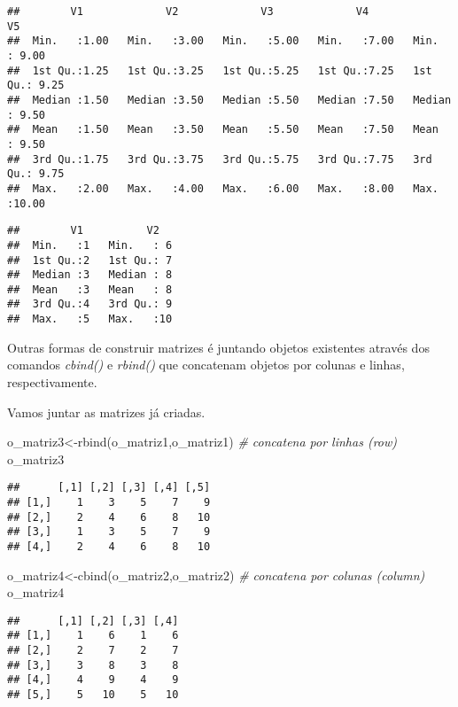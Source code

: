 \documentclass[
]{book}
\newenvironment{Shaded}{\begin{snugshade}}{\end{snugshade}}
\newcommand{\CommentTok}[1]{\textcolor[rgb]{0.56,0.35,0.01}{\textit{#1}}}
\newcommand{\FunctionTok}[1]{\textcolor[rgb]{0.00,0.00,0.00}{#1}}
\newcommand{\NormalTok}[1]{#1}
\newcommand{\OtherTok}[1]{\textcolor[rgb]{0.56,0.35,0.01}{#1}}
\begin{document}
\begin{verbatim}
##        V1             V2             V3             V4             V5       
##  Min.   :1.00   Min.   :3.00   Min.   :5.00   Min.   :7.00   Min.   : 9.00  
##  1st Qu.:1.25   1st Qu.:3.25   1st Qu.:5.25   1st Qu.:7.25   1st Qu.: 9.25  
##  Median :1.50   Median :3.50   Median :5.50   Median :7.50   Median : 9.50  
##  Mean   :1.50   Mean   :3.50   Mean   :5.50   Mean   :7.50   Mean   : 9.50  
##  3rd Qu.:1.75   3rd Qu.:3.75   3rd Qu.:5.75   3rd Qu.:7.75   3rd Qu.: 9.75  
##  Max.   :2.00   Max.   :4.00   Max.   :6.00   Max.   :8.00   Max.   :10.00
\end{verbatim}

\begin{verbatim}
##        V1          V2    
##  Min.   :1   Min.   : 6  
##  1st Qu.:2   1st Qu.: 7  
##  Median :3   Median : 8  
##  Mean   :3   Mean   : 8  
##  3rd Qu.:4   3rd Qu.: 9  
##  Max.   :5   Max.   :10
\end{verbatim}

Outras formas de construir matrizes é juntando objetos existentes através dos comandos \emph{cbind()} e \emph{rbind()} que concatenam objetos por colunas e linhas, respectivamente.

Vamos juntar as matrizes já criadas.

\begin{Shaded}
\begin{Highlighting}[]
\NormalTok{o\_matriz3}\OtherTok{\textless{}{-}}\FunctionTok{rbind}\NormalTok{(o\_matriz1,o\_matriz1) }\CommentTok{\# concatena por linhas (row)}
\NormalTok{o\_matriz3}
\end{Highlighting}
\end{Shaded}

\begin{verbatim}
##      [,1] [,2] [,3] [,4] [,5]
## [1,]    1    3    5    7    9
## [2,]    2    4    6    8   10
## [3,]    1    3    5    7    9
## [4,]    2    4    6    8   10
\end{verbatim}

\begin{Shaded}
\begin{Highlighting}[]
\NormalTok{o\_matriz4}\OtherTok{\textless{}{-}}\FunctionTok{cbind}\NormalTok{(o\_matriz2,o\_matriz2) }\CommentTok{\# concatena por colunas (column)}
\NormalTok{o\_matriz4}
\end{Highlighting}
\end{Shaded}

\begin{verbatim}
##      [,1] [,2] [,3] [,4]
## [1,]    1    6    1    6
## [2,]    2    7    2    7
## [3,]    3    8    3    8
## [4,]    4    9    4    9
## [5,]    5   10    5   10
\end{verbatim}
\end{document}
